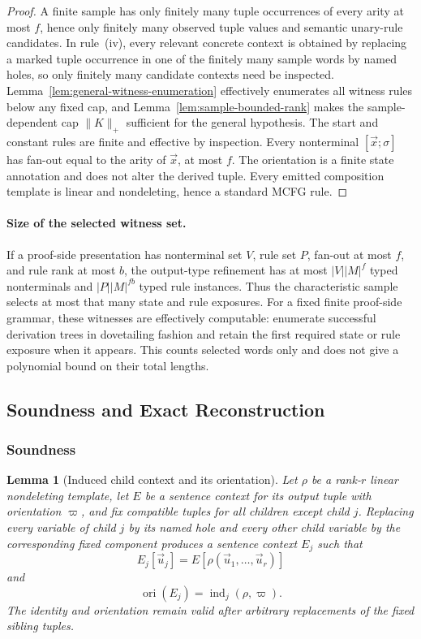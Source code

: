 \documentclass[11pt,a4paper]{article}
\numberwithin{equation}{section}
\theoremstyle{plain}
\newtheorem{lemma}[theorem]{Lemma}
\theoremstyle{definition}
\theoremstyle{remark}
\newcommand{\tuple}[1]{\vec{#1}}
\begin{document}
\begin{proof}
A finite sample has only finitely many tuple occurrences of every arity at most
\(f\), hence only finitely many observed tuple values and semantic unary-rule
candidates.  In rule~(iv), every relevant concrete context is obtained by
replacing a marked tuple occurrence in one of the finitely many sample words by
named holes, so only finitely many candidate contexts need be inspected.
Lemma~\ref{lem:general-witness-enumeration} effectively enumerates
all witness rules below any fixed cap, and
Lemma~\ref{lem:sample-bounded-rank} makes the sample-dependent cap
\(\|K\|_+\) sufficient for the general hypothesis.  The start and constant
rules are finite and effective by inspection.  Every nonterminal
\([\tuple x;\sigma]\) has fan-out equal to the arity of \(\tuple x\), at most
\(f\).  The orientation is a finite state annotation and does not alter the
derived tuple.  Every emitted composition template is linear and nondeleting,
hence a standard MCFG rule.
\end{proof}


\paragraph{Size of the selected witness set.}
If a proof-side presentation has nonterminal set $V$, rule set $P$, fan-out at
most $f$, and rule rank at most $b$, the output-type refinement has at most
$|V||M|^f$ typed nonterminals and $|P||M|^{fb}$ typed rule instances.  Thus
the characteristic sample selects at most that many state and rule exposures.
For a fixed finite proof-side grammar, these witnesses are effectively
computable: enumerate successful derivation trees in dovetailing fashion and
retain the first required state or rule exposure when it appears.  This counts
selected words only and does not give a polynomial bound on their total
lengths.

\subsection{Soundness and Exact Reconstruction}
\subsubsection{Soundness}
\label{sec:soundness}

\begin{lemma}[Induced child context and its orientation]
\label{lem:filling-identity}
Let \(\rho\) be a rank-\(r\) linear nondeleting template, let \(E\) be a
sentence context for its output tuple with orientation \(\varpi\), and fix
compatible tuples for all children except child \(j\).  Replacing every
variable of child \(j\) by its named hole and every other child variable by
the corresponding fixed component produces a sentence context \(E_j\) such
that
\[
  E_j[\tuple u_j]=E[\rho(\tuple u_1,\ldots,\tuple u_r)]
\]
and
\[
  \operatorname{ori}(E_j)=\operatorname{ind}_j(\rho,\varpi).
\]
The identity and orientation remain valid after arbitrary replacements of the
fixed sibling tuples.
\end{lemma}
\end{document}

